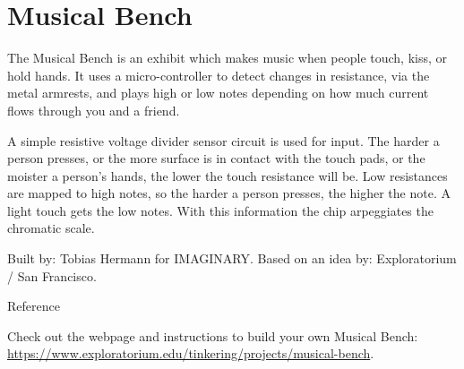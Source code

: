\section{Musical Bench}
The Musical Bench is an exhibit which makes music when people touch, kiss, or hold hands. It uses a micro-controller to detect changes in resistance, via the metal armrests, and plays high or low notes depending on how much current flows through you and a friend. 

A simple resistive voltage divider sensor circuit is used for input. The harder a person presses, or the more surface is in contact with the touch pads, or the moister a person's hands, the lower the touch resistance will be. Low resistances are mapped to high notes, so the harder a person presses, the higher the note. A light touch gets the low notes. With this information the chip arpeggiates the chromatic scale. 

\vfill

Built by: Tobias Hermann for IMAGINARY.
Based on an idea by: Exploratorium / San Francisco.

Reference

Check out the webpage and instructions to build your own Musical Bench: \url{https://www.exploratorium.edu/tinkering/projects/musical-bench}.